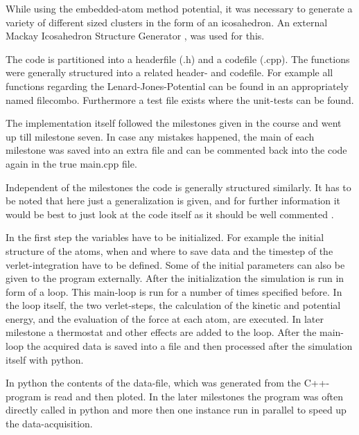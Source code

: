 While using the embedded-atom method potential, it was necessary to generate a variety of different sized clusters in the form of an icosahedron. An external Mackay Icosahedron Structure Generator \cite{icosader}, was used for this.
\begin{comment}
--
code is structured into the milestones, so an individual milestone can be rerun in case of fuckup
parted into h and cpp files as usual
followed the structure of the milestone
\end{comment}

The code is partitioned into a headerfile (.h) and a codefile (.cpp). The functions were generally structured into a related header- and codefile. For example all functions regarding the Lenard-Jones-Potential can be found in an appropriately named filecombo. Furthermore a test file exists where the unit-tests can be found.
\par
The implementation itself followed the milestones given in the course and went up till milestone seven. 
In case any mistakes happened, the main of each milestone was saved into an extra file and can be commented back into the code again in the true main.cpp file. 
\par 
Independent of the milestones the code is generally structured similarly. It has to be noted that here just a generalization is given, and for further information it would be best to just look at the code itself as it should be well commented \cite{molDymGithub}.
\par 
In the first step the variables have to be initialized. For example the initial structure of the atoms, when and where to save data and the timestep of the verlet-integration have to be defined. Some of the initial parameters can also be given to the program externally. After the initialization the simulation is run in form of a loop. This main-loop is run for a number of times specified before. In the loop itself, the two verlet-steps, the calculation of the kinetic and potential energy, and the evaluation of the force at each atom, are executed. In later milestone a thermostat and other effects are added to the loop. 
After the main-loop the acquired data is saved into a file and then processed after the simulation itself with python. 
\par 
In python the contents of the data-file, which was generated from the C++-program is read and then ploted. In the later milestones the program was often directly called in python and more then one instance run in parallel to speed up the data-acquisition. 




